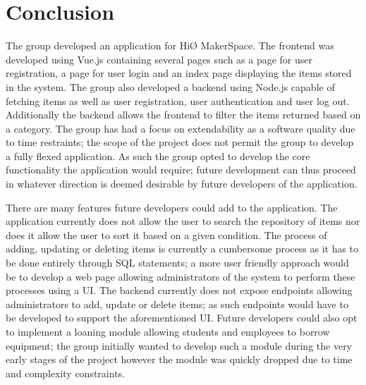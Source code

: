 \chapter{Conclusion}

The group developed an application for HiØ MakerSpace.
The frontend was developed using Vue.js containing several pages such as a page for user registration, a page for user login and an index page displaying the items stored in the system.
The group also developed a backend using Node.js capable of fetching items as well as user registration, user authentication and user log out.
Additionally the backend allows the frontend to filter the items returned based on a category.
The group has had a focus on extendability as a software quality due to time restraints; the scope of the project does not permit the group to develop a fully flexed application.
As such the group opted to develop the core functionality the application would require; future development can thus proceed in whatever direction is deemed desirable by future developers of the application.

There are many features future developers could add to the application.
The application currently does not allow the user to search the repository of items nor does it allow the user to sort it based on a given condition.
The process of adding, updating or deleting items is currently a cumbersome process as it has to be done entirely through SQL statements; a more user friendly approach would be to develop a web page allowing administrators of the system to perform these processes using a UI.
The backend currently does not expose endpoints allowing administrators to add, update or delete items; as such endpoints would have to be developed to support the aforementioned UI.
Future developers could also opt to implement a loaning module allowing students and employees to borrow equipment; the group initially wanted to develop such a module during the very early stages of the project however the module was quickly dropped due to time and complexity constraints.




